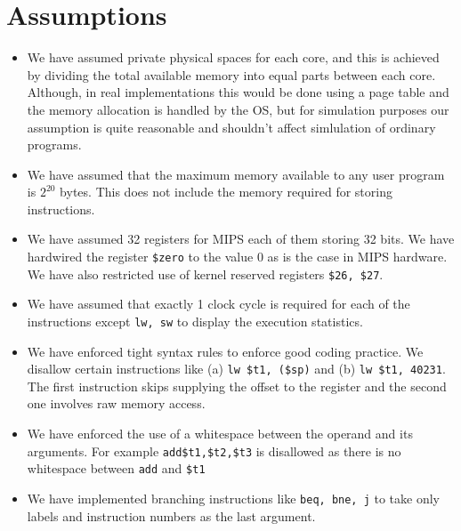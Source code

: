 \documentclass[hidelinks,12pt]{article}
\begin{document}
\section{Assumptions}
\begin{itemize}
    \item We have assumed private physical spaces for each core, and this is achieved by dividing the total available memory into equal parts between each core. Although, in real implementations this would be done using a page table and the memory allocation is handled by the OS, but for simulation purposes our assumption is quite reasonable and shouldn't affect simlulation of ordinary programs.
    \item We have assumed that the maximum memory available to any user program is $2^{20}$ bytes. This does not include the memory required for storing instructions.
    \item We have assumed 32 registers for MIPS each of them storing 32 bits. We have hardwired the register \verb|$zero| to the value $0$ as is the case in MIPS hardware. We have also restricted use of kernel reserved registers \verb|$26, $27|.
    \item We have assumed that exactly 1 clock cycle is required for each of the instructions except \verb|lw, sw| to display the execution statistics.
    \item We have enforced tight syntax rules to enforce good coding practice. We disallow certain instructions like (a) \verb|lw $t1, ($sp)| and (b) \verb|lw $t1, 40231|.
          The first instruction skips supplying the offset to the register and the second one involves raw memory access.
    \item We have enforced the use of a whitespace between the operand and its arguments. For example \verb|add$t1,$t2,$t3| is disallowed as there is no whitespace between \verb|add| and \verb|$t1|
    \item We have implemented branching instructions like \verb|beq, bne, j| to take only labels and instruction numbers as the last argument.
\end{itemize}
\end{document}
